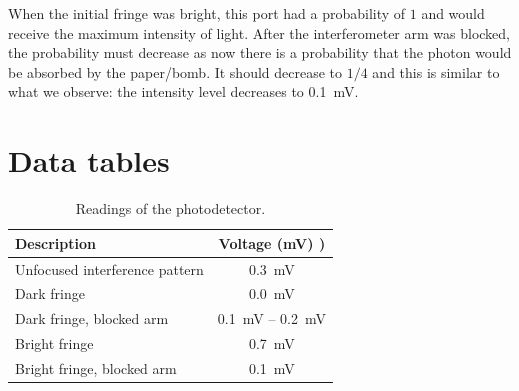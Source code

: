 \documentclass[notitlepage]{report}
\begin{document}
	When the initial fringe was bright, this port had a probability of $1$ and would receive the maximum intensity of light. After the interferometer arm was blocked, the probability must decrease as now there is a probability that the photon would be absorbed by the paper/bomb. It should decrease to $1/4$ and this is similar to what we observe: the intensity level decreases to \SI{0.1}{\mV}.

		

	\section*{Data tables}
	
	\begin{table}[h]
		\caption{Readings of the photodetector.}
		\centering
		\begin{tabular}{lc}
			\toprule
			Description & Voltage (\si{\mV}) )\\
			\midrule
			Unfocused interference pattern & \SI{0.3}{\mV} \\
			Dark fringe & \SI{0.0}{\mV} \\
			Dark fringe, blocked arm & \SI{0.1}{\mV} -- \SI{0.2}{\mV} \\
			Bright fringe & \SI{0.7}{\mV} \\
			Bright fringe, blocked arm & \SI{0.1}{\mV} \\
			\bottomrule
		\end{tabular}
	\end{table}
\end{document}

